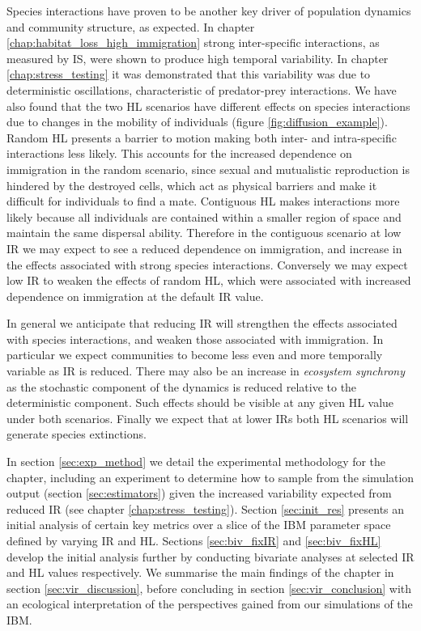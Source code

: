 Species interactions have proven to be another key driver of population dynamics and community structure, as expected. In chapter \ref{chap:habitat_loss_high_immigration} strong inter-specific interactions, as measured by IS, were shown to produce high temporal variability. In chapter \ref{chap:stress_testing} it was demonstrated that this variability was due to deterministic oscillations, characteristic of predator-prey interactions. We have also found that the two HL scenarios have different effects on species interactions due to changes in the mobility of individuals (figure \ref{fig:diffusion_example}). Random HL presents a barrier to motion making both inter- and intra-specific interactions less likely. This accounts for the increased dependence on immigration in the random scenario, since sexual and mutualistic reproduction is hindered by the destroyed cells, which act as physical barriers and make it difficult for individuals to find a mate. Contiguous HL makes interactions more likely because all individuals are contained within a smaller region of space and maintain the same dispersal ability. Therefore in the contiguous scenario at low IR we may expect to see a reduced dependence on immigration, and increase in the effects associated with strong species interactions. Conversely we may expect low IR to weaken the effects of random HL, which were associated with increased dependence on immigration at the default IR value.   

In general we anticipate that reducing IR will strengthen the effects associated with species interactions, and weaken those associated with immigration. In particular we expect communities to become less even and more temporally variable as IR is reduced. There may also be an increase in \emph{ecosystem synchrony} as the stochastic component of the dynamics is reduced relative to the deterministic component. Such effects should be visible at any given HL value under both scenarios. Finally we expect that at lower IRs both HL scenarios will generate species extinctions. 

In section \ref{sec:exp_method} we detail the experimental methodology for the chapter, including an experiment to determine how to sample from the simulation output (section \ref{sec:estimators}) given the increased variability expected from reduced IR (see chapter \ref{chap:stress_testing}). Section \ref{sec:init_res} presents an initial analysis of certain key metrics over a slice of the IBM parameter space defined by varying IR and HL. Sections \ref{sec:biv_fixIR} and \ref{sec:biv_fixHL} develop the initial analysis further by conducting bivariate analyses at selected IR and HL values respectively.  We summarise the main findings of the chapter in section \ref{sec:vir_discussion}, before concluding in section \ref{sec:vir_conclusion} with an ecological interpretation of the perspectives gained from our simulations of the IBM.

